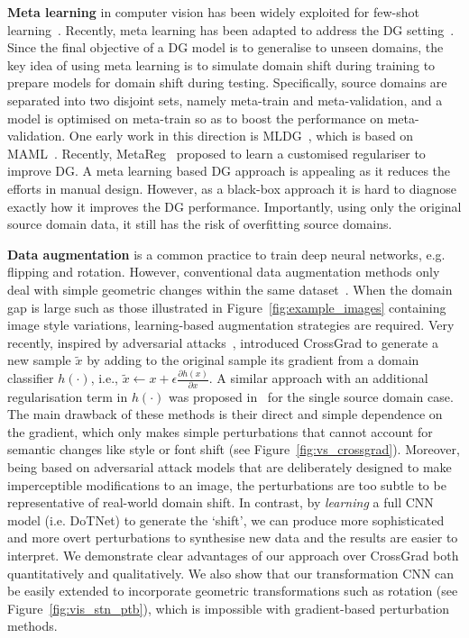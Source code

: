 \documentclass[letterpaper]{article}
\newcommand{\keypoint}[1]{\vspace{0.1cm}\noindent\textbf{#1}}
\begin{document}
\keypoint{Meta learning} in computer vision has been widely exploited for few-shot learning~\cite{finn2017model}. Recently, meta learning has been adapted to address the DG setting~\cite{li2018learning,balaji2018metareg}. Since the final objective of a DG model is to generalise to unseen domains, the key idea of using meta learning is to simulate domain shift during training to prepare models for domain shift during testing. Specifically, source domains are separated into two disjoint sets, namely meta-train and meta-validation, and a model is optimised on meta-train so as to boost the performance on meta-validation. One early work in this direction is MLDG~\cite{li2018learning}, which is based on MAML~\cite{finn2017model}. Recently, MetaReg~\cite{balaji2018metareg} proposed to learn a customised regulariser to improve DG. A meta learning based DG approach is appealing as it reduces the efforts in manual design. However, as a black-box approach it is hard to diagnose exactly how it improves the DG performance. Importantly, using only the original source domain data, it still has the risk of overfitting source domains.

\keypoint{Data augmentation} is a common practice to train deep neural networks, e.g. flipping and rotation. However, conventional data augmentation methods only deal with simple geometric changes within the same dataset~\cite{volpi2019model}. When the domain gap is large such as those illustrated in Figure~\ref{fig:example_images} containing image style variations, learning-based augmentation strategies are required. Very recently, inspired by adversarial attacks~\cite{goodfellow2015explaining}, \cite{shankar2018generalizing} introduced CrossGrad to generate a new sample $\tilde{x}$ by adding to the original sample its gradient from a domain classifier $h(\cdot)$, i.e., $\tilde{x} \leftarrow x + \epsilon \frac{\partial h(x)}{\partial x}$. A similar approach with an additional regularisation term in $h(\cdot)$ was proposed in~\cite{volpi2018generalizing} for the single source domain case. The main drawback of these methods is their direct and simple dependence on the gradient, which only makes simple perturbations that cannot account for semantic changes like style or font shift (see Figure~\ref{fig:vs_crossgrad}). Moreover, being based on adversarial attack models that are deliberately designed to make imperceptible modifications to an image, the perturbations are too subtle to be representative of real-world domain shift. In contrast, by \emph{learning} a full CNN model (i.e. DoTNet) to generate the `shift', we can produce more sophisticated and more overt perturbations to synthesise new data and the results are easier to interpret. We demonstrate clear advantages of our approach over CrossGrad both quantitatively and qualitatively. We also show that our transformation CNN can be easily extended to incorporate geometric transformations such as rotation (see Figure~\ref{fig:vis_stn_ptb}), which is impossible with gradient-based perturbation methods.
\end{document}
